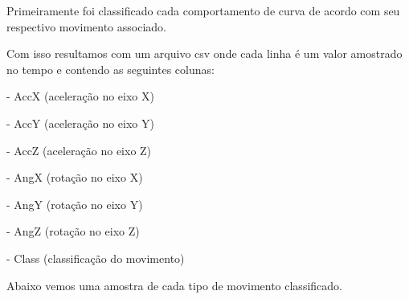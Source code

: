 Primeiramente foi classificado cada comportamento de curva de acordo com seu 
respectivo movimento associado.

Com isso resultamos com um arquivo csv onde cada linha é um valor amostrado no tempo e 
contendo as seguintes colunas:

- AccX (aceleração no eixo X)

- AccY (aceleração no eixo Y)

- AccZ (aceleração no eixo Z)

- AngX (rotação no eixo X)

- AngY (rotação no eixo Y)

- AngZ (rotação no eixo Z)

- Class (classificação do movimento)

Abaixo vemos uma amostra de cada tipo de movimento classificado.

